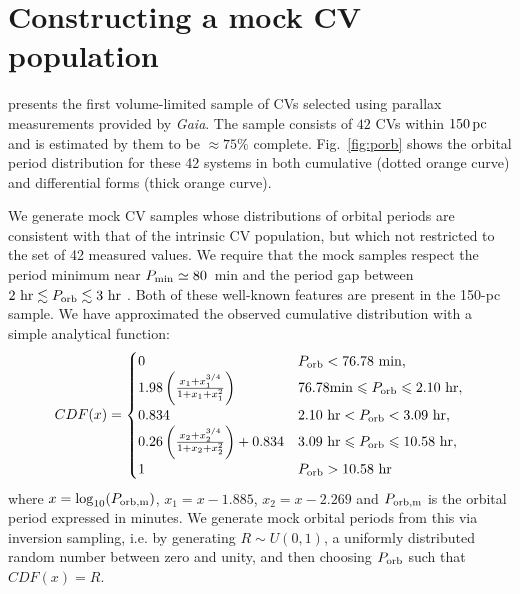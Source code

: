 \documentclass[fleqn,usenatbib]{mnras}
\newcommand{\gaia}{{\it Gaia}}
\begin{document}
\section{Constructing a mock CV population}\label{sec:mock_CV}

\cite{pala20} presents the first volume-limited sample of CVs selected using parallax measurements provided by \gaia. The sample consists of $42$ CVs within $150\,\rm{pc}$ and is estimated by them to be $\approx 75\%$ complete. Fig.~\ref{fig:porb} shows the orbital period distribution for these 42 systems in both cumulative (dotted orange curve) and differential forms (thick orange curve).

We generate mock CV samples whose distributions of orbital periods are consistent with that of the intrinsic CV population, but which not restricted to the set of 42 measured values. We require that the mock samples respect the period minimum near $P_{\rm{min}} \simeq 80$~min and the period gap between $2~\mathrm{hr} \lesssim P_{\rm{orb}} \lesssim 3~\mathrm{hr}$ \citep[e.g.][]{gansicke09, knigge06}. Both of these well-known features are present in the \cite{pala20} 150-pc sample. We have approximated the observed cumulative distribution with a simple analytical function:
\begin{equation}
CDF(x) = 
\begin{cases}
      0 & P_{\rm{orb}} < 76.78~\mathrm{min}, \\
      1.98 \left(\frac{x_1 + x_1^{3/4}}{1 + x_1 + x_1^2}\right) & 76.78 \mathrm{min} \leq P_{\rm{orb}} \leq 2.10~\mathrm{hr},\\
      0.834 & 2.10~\mathrm{hr} < P_{\rm{orb}} < 3.09~\mathrm{hr},\\
      0.26 \left(\frac{x_2 + x_2^{3/4}}{1 + x_2 + x_2^2}\right) + 0.834  & 3.09~\mathrm{hr} \leq P_{\rm{orb}} \leq 10.58~\mathrm{hr},\\
      1 & P_{\rm{orb}} > 10.58~\mathrm{hr}
\end{cases}
\label{eq:cdf}
\end{equation}
where $x = \log_{10}({P_{\rm{orb,m}}})$, $x_1 = x - 1.885$, $x_2 = x - 2.269$
and $P_{\rm{orb,m}}$ is the orbital period expressed in minutes. %
We generate mock orbital periods from this via inversion sampling, i.e. by generating $R \sim U(0,1)$, a uniformly distributed random number between zero and unity, and then choosing $P_{\rm{orb}}$ such that $CDF(x) = R$. 
\end{document}
